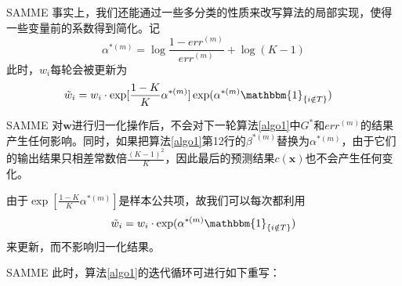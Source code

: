 \documentclass{ctexbeamer}        %
\begin{document}
\begin{frame}{SAMME}
事实上，我们还能通过一些多分类的性质来改写算法的局部实现，使得一些变量前的系数得到简化。记
$$\alpha^{*(m)}=\log\frac{1-err^{(m)}}{err^{(m)}}+\log(K-1)$$
此时，$w_i$每轮会被更新为
\begin{align*}
\tilde{w}_i &= w_i\cdot\exp[\frac{1-K}{K}\alpha^{*(m)}]\exp(\alpha^{*(m)}\mathbbm{1}_{\{i\notin T\}})
\end{align*}
\end{frame}
\begin{frame}{SAMME}
对$\mathbf{w}$进行归一化操作后，不会对下一轮算法\ref{algo1}中$G^*$和$err^{(m)}$的结果产生任何影响。同时，如果把算法\ref{algo1}第12行的$\beta^{*(m)}$替换为$\alpha^{*(m)}$，由于它们的输出结果只相差常数倍$\frac{(K-1)^2}{K}$，因此最后的预测结果$c(\mathbf{x})$也不会产生任何变化。
\newline

由于$\exp[\frac{1-K}{K}\alpha^{*(m)}]$是样本公共项，故我们可以每次都利用
$$\tilde{w}_i = w_i\cdot\exp(\alpha^{*(m)}\mathbbm{1}_{\{i\notin T\}})$$
来更新，而不影响归一化结果。
\end{frame}
\begin{frame}{SAMME}
此时，算法\ref{algo1}的迭代循环可进行如下重写：

\begin{center}
\end{center}

\end{frame}
\end{document}
